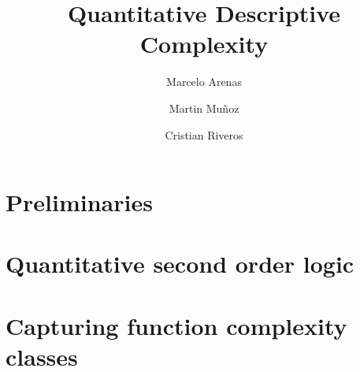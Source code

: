\documentclass[a4paper]{article}
\begin{document}
\title{Quantitative Descriptive Complexity}
\author{Marcelo Arenas \and Martin Mu\~noz \and Cristian Riveros}

\maketitle

\section{Preliminaries}
\label{sec:prelim}



\section{Quantitative second order logic}
\label{sec:logics}



\section{Capturing function complexity classes}
\label{sec:cap-comp}





\end{document}
